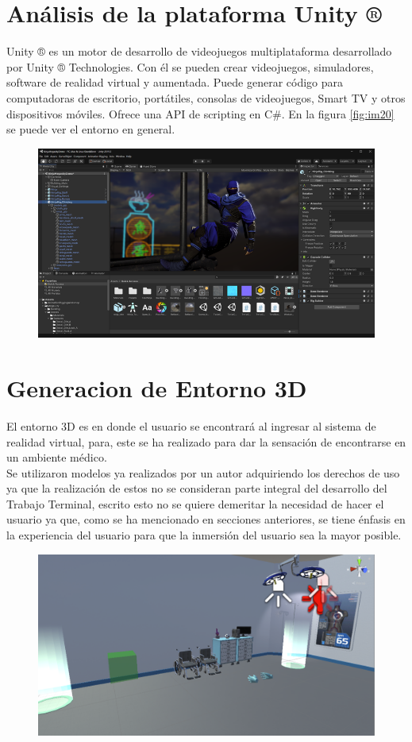 \section{Análisis de la plataforma Unity ®}
Unity ® es un motor de desarrollo de videojuegos multiplataforma desarrollado por Unity ® Technologies. Con él se pueden crear videojuegos, simuladores, 
software de realidad virtual y aumentada. Puede generar código para computadoras de escritorio, portátiles, consolas de videojuegos, Smart TV y otros dispositivos móviles. 
Ofrece una API de scripting en C\#. En la figura \ref{fig:im20} se puede ver el entorno en general.\\
\begin{figure}[H]
	\begin{center}
 		\includegraphics[width = .5\textwidth]{source/images/image33.png}
	\end{center} 
\end{figure}

\section{Generacion de Entorno 3D}
El entorno 3D es en donde el usuario se encontrará al ingresar al sistema de realidad virtual, para, este se ha realizado para dar la sensación de encontrarse en un ambiente médico.\\
Se utilizaron modelos ya realizados por un autor adquiriendo los derechos de uso ya que la realización de estos no se consideran parte integral del desarrollo del Trabajo Terminal, 
escrito esto no se quiere demeritar la necesidad de hacer el usuario ya que, como se ha mencionado en secciones anteriores, se tiene énfasis en la experiencia del usuario para que 
la inmersión del usuario sea la mayor posible.\\
\begin{figure}[H]
	\begin{center}
 		\includegraphics[width = .5\textwidth]{source/images/image63.png}
	\end{center} 
\end{figure}

